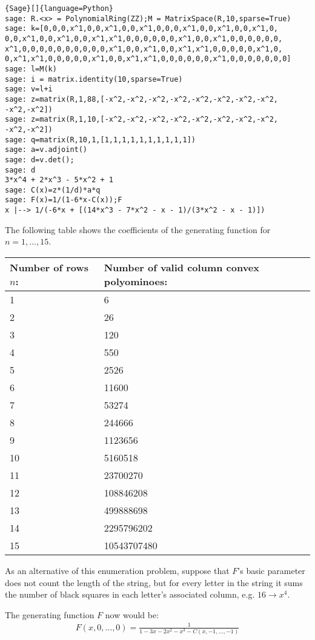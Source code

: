 \documentclass[12pt]{report}
\begin{document}
{{{\begin{lstlisting}{Sage}[]{language=Python}
sage: R.<x> = PolynomialRing(ZZ);M = MatrixSpace(R,10,sparse=True)
sage: k=[0,0,0,x^1,0,0,x^1,0,0,x^1,0,0,0,x^1,0,0,x^1,0,0,x^1,0,
0,0,x^1,0,0,x^1,0,0,x^1,x^1,0,0,0,0,0,0,x^1,0,0,x^1,0,0,0,0,0,0,
x^1,0,0,0,0,0,0,0,0,0,0,x^1,0,0,x^1,0,0,x^1,x^1,0,0,0,0,0,x^1,0,
0,x^1,x^1,0,0,0,0,0,x^1,0,0,x^1,x^1,0,0,0,0,0,0,x^1,0,0,0,0,0,0,0]
sage: l=M(k)
sage: i = matrix.identity(10,sparse=True)
sage: v=l+i
sage: z=matrix(R,1,88,[-x^2,-x^2,-x^2,-x^2,-x^2,-x^2,-x^2,-x^2,
-x^2,-x^2])
sage: z=matrix(R,1,10,[-x^2,-x^2,-x^2,-x^2,-x^2,-x^2,-x^2,-x^2,
-x^2,-x^2])
sage: q=matrix(R,10,1,[1,1,1,1,1,1,1,1,1,1])
sage: a=v.adjoint()
sage: d=v.det();
sage: d
3*x^4 + 2*x^3 - 5*x^2 + 1
sage: C(x)=z*(1/d)*a*q
sage: F(x)=1/(1-6*x-C(x));F
x |--> 1/(-6*x + [(14*x^3 - 7*x^2 - x - 1)/(3*x^2 - x - 1)])
\end{lstlisting}}

\noindent The following table shows the coefficients of the generating function for $n=1,\ldots,15$.

\begin{center}
\begin{tabular}{ |p{3cm}|p{3cm}|  }
 \hline
 Number of rows 	$n$: & Number of valid column convex polyominoes: \\
 \hline
 1   & 6    \\
 2 &   26  \\
 3 & 120 \\
 4    & 550 \\
 5 &   2526  \\
 6 & 11600  \\
 7 & 53274  \\
 8 & 244666  \\
 9 & 1123656  \\
 10 & 5160518  \\
 11 & 23700270  \\
 12 & 108846208  \\
 13 & 499888698  \\
 14 & 2295796202  \\
 15 & 10543707480  \\
 \hline
\end{tabular}
\end{center}


\noindent As an alternative of this enumeration problem, suppose that $F$'s basic parameter does not count the length of the string, but for every letter in the string it sums the number of black squares in each letter's associated column, e.g. $16 \rightarrow x^4$.

\noindent The generating function $F$ now would be:
\begin{align*}
F(x,0,\ldots,0)= \frac{1}{1- 3x - 2 x^2 - x^3 - C(x,-1,\ldots,-1)}
\end{align*}

}}
\end{document}
